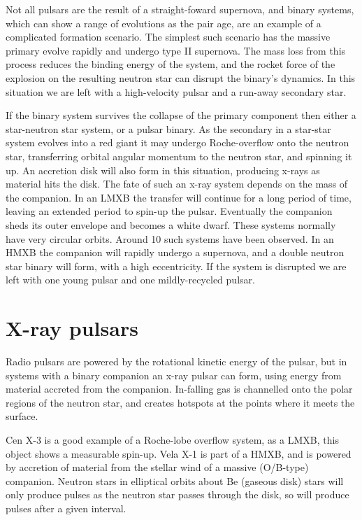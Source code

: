Not all pulsars are the result of a straight-foward supernova, and
binary systems, which can show a range of evolutions as the pair age,
are an example of a complicated formation scenario. The simplest such
scenario has the massive primary evolve rapidly and undergo type II
supernova. The mass loss from this process reduces the binding energy
of the system, and the rocket force of the explosion on the resulting
neutron star can disrupt the binary's dynamics. In this situation we
are left with a high-velocity pulsar and a run-away secondary star. 

If the binary system survives the collapse of the primary component
then either a star-neutron star system, or a pulsar binary. As the
secondary in a star-star system evolves into a red giant it may
undergo Roche-overflow onto the neutron star, transferring orbital
angular momentum to the neutron star, and spinning it up. An accretion
disk will also form in this situation, producing x-rays as material
hits the disk. The fate of such an x-ray system depends on the mass of
the companion. In an LMXB the transfer will continue for a long period
of time, leaving an extended period to spin-up the pulsar. Eventually
the companion sheds its outer envelope and becomes a white
dwarf. These systems normally have very circular orbits. Around 10
such systems have been observed. In an HMXB the companion will rapidly
undergo a supernova, and a double neutron star binary will form, with
a high eccentricity. If the system is disrupted we are left with one
young pulsar and one mildly-recycled pulsar.

\section{X-ray pulsars}
\label{sec:x-ray-pulsars}

Radio pulsars are powered by the rotational kinetic energy of the
pulsar, but in systems with a binary companion an x-ray pulsar can
form, using energy from material accreted from the
companion. In-falling gas is channelled onto the polar regions of the
neutron star, and creates hotspots at the points where it meets the
surface.

Cen X-3 is a good example of a Roche-lobe overflow system, as a LMXB,
this object shows a measurable spin-up. Vela X-1 is part of a HMXB,
and is powered by accretion of material from the stellar wind of a
massive (O/B-type) companion. Neutron stars in elliptical orbits about
Be (gaseous disk) stars will only produce pulses as the neutron star
passes through the disk, so will produce pulses after a given
interval.

